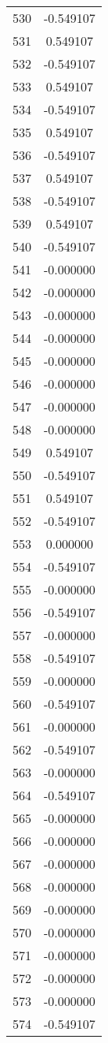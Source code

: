 \documentclass[12pt]{article}
\begin{document}
\begin{longtable}{@{}cc@{}}
530 & -0.549107 \\
531 & 0.549107 \\
532 & -0.549107 \\
533 & 0.549107 \\
534 & -0.549107 \\
535 & 0.549107 \\
536 & -0.549107 \\
537 & 0.549107 \\
538 & -0.549107 \\
539 & 0.549107 \\
540 & -0.549107 \\
541 & -0.000000 \\
542 & -0.000000 \\
543 & -0.000000 \\
544 & -0.000000 \\
545 & -0.000000 \\
546 & -0.000000 \\
547 & -0.000000 \\
548 & -0.000000 \\
549 & 0.549107 \\
550 & -0.549107 \\
551 & 0.549107 \\
552 & -0.549107 \\
553 & 0.000000 \\
554 & -0.549107 \\
555 & -0.000000 \\
556 & -0.549107 \\
557 & -0.000000 \\
558 & -0.549107 \\
559 & -0.000000 \\
560 & -0.549107 \\
561 & -0.000000 \\
562 & -0.549107 \\
563 & -0.000000 \\
564 & -0.549107 \\
565 & -0.000000 \\
566 & -0.000000 \\
567 & -0.000000 \\
568 & -0.000000 \\
569 & -0.000000 \\
570 & -0.000000 \\
571 & -0.000000 \\
572 & -0.000000 \\
573 & -0.000000 \\
574 & -0.549107 \\

\end{longtable}
\end{document}
